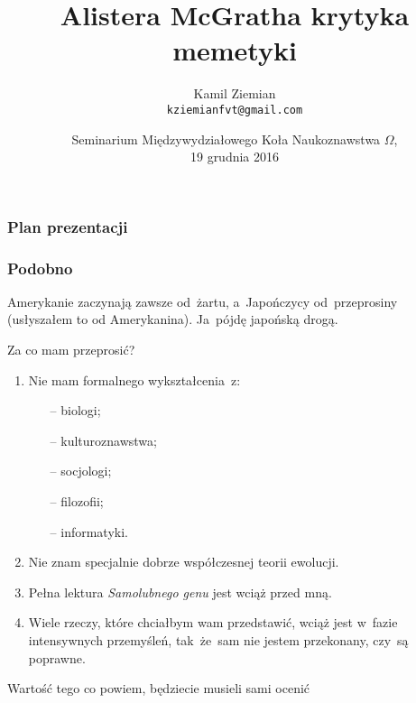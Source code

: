 \documentclass[10pt,t]{beamer}
\title{Alistera McGratha krytyka memetyki}
\author{Kamil Ziemian \\
  \texttt{kziemianfvt@gmail.com}}
\date[19 XII 2016]{Seminarium Międzywydziałowego Koła Naukoznawstwa $\Omega$, \\
  19 grudnia 2016}
\begin{document}





\maketitle %





\begin{frame}
  \frametitle{Plan prezentacji}


  \tableofcontents %

\end{frame}




\begin{frame}
  \frametitle{Podobno}


  Amerykanie zaczynają zawsze od~żartu, a~Japończycy od~przeprosiny
  (usłyszałem to od Amerykanina). Ja~pójdę japońską drogą.


  Za co mam przeprosić?
  \begin{enumerate}

  \item Nie mam formalnego wykształcenia~z:
    \begin{itemize}

    \item[--] biologi;

    \item[--] kulturoznawstwa;

    \item[--] socjologi;

    \item[--] filozofii;

    \item[--] informatyki.

    \end{itemize}

  \item Nie znam specjalnie dobrze współczesnej teorii ewolucji.

  \item Pełna lektura \textit{Samolubnego genu} jest wciąż przed mną.

  \item Wiele rzeczy, które chciałbym wam przedstawić, wciąż jest
    w~fazie intensywnych przemyśleń, tak~że~sam nie jestem
    przekonany, czy~są poprawne.

  \end{enumerate}

  Wartość tego co powiem, będziecie musieli sami ocenić

\end{frame}
\end{document}
